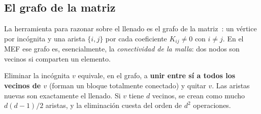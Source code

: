 \documentclass[11pt,a4paper]{article}
\begin{document}
\subsection{El grafo de la matriz}\label{sec:grafo}

La herramienta para razonar sobre el llenado es el grafo de la matriz~\cite{george1981,davis2006}: un vértice por incógnita y una arista $\{i,j\}$ por cada coeficiente $K_{ij}\neq0$ con $i\neq j$. En el MEF ese grafo es, esencialmente, la \emph{conectividad de la malla}: dos nodos son vecinos si comparten un elemento.

\begin{clave}[title={Regla de eliminación en el grafo~\cite{parter1961,rose1972}}]
Eliminar la incógnita $v$ equivale, en el grafo, a \textbf{unir entre sí a todos los vecinos de $v$} (forman un bloque totalmente conectado) y quitar $v$. Las aristas nuevas son exactamente el llenado. Si $v$ tiene $d$ vecinos, se crean como mucho $d(d-1)/2$ aristas, y la eliminación cuesta del orden de $d^2$ operaciones.
\end{clave}
\end{document}
